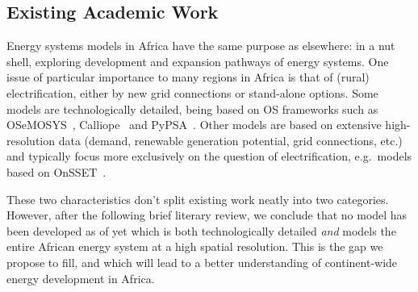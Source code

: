 \documentclass[conference, a4paper]{IEEEtran}
\begin{document}
\subsection{Existing Academic Work}


Energy systems models in Africa have the same purpose as elsewhere: in a nut shell, exploring development and expansion pathways of energy systems.
One issue of particular importance to many regions in Africa is that of (rural) electrification, either by new grid connections or stand-alone options.
Some models are technologically detailed, being based on OS frameworks such as OSeMOSYS~\cite{howells-rogner-ea-2011}, Calliope~\cite{pfenninger-pickering-2018} and PyPSA~\cite{brown-horsch-ea-2018}.
Other models are based on extensive high-resolution data (demand, renewable generation potential, grid connections, etc.) and typically focus more exclusively on the question of electrification, e.g.\ models based on OnSSET~\cite{mentis-howells-ea-2017}.

These two characteristics don't split existing work neatly into two categories.
However, after the following brief literary review, we conclude that no model has been developed as of yet which is both technologically detailed \emph{and} models the entire African energy system at a high spatial resolution.
This is the gap we propose to fill, and which will lead to a better understanding of continent-wide energy development in Africa.
\end{document}
